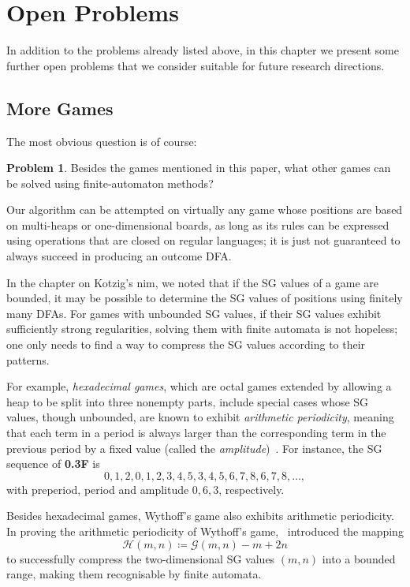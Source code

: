 \documentclass[11pt]{article}
\theoremstyle{definition}
\newtheorem{problem}{Problem}[section]
\theoremstyle{plain}
\newcommand{\varG}{\mathcal{G}}
\newcommand{\varH}{\mathcal{H}}
\begin{document}
\section{Open Problems}

In addition to the problems already listed above, in this chapter we present some further open problems that we consider suitable for future research directions.

\subsection{More Games}

The most obvious question is of course:
\begin{problem}
    Besides the games mentioned in this paper, what other games can be solved using finite-automaton methods?
\end{problem}
Our algorithm can be attempted on virtually any game whose positions are based on multi-heaps or one-dimensional boards, as long as its rules can be expressed using operations that are closed on regular languages; it is just not guaranteed to always succeed in producing an outcome DFA.

In the chapter on Kotzig's nim, we noted that if the SG values of a game are bounded, it may be possible to determine the SG values of positions using finitely many DFAs.
For games with unbounded SG values, if their SG values exhibit sufficiently strong regularities, solving them with finite automata is not hopeless; one only needs to find a way to compress the SG values according to their patterns.

For example, \textit{hexadecimal games}, which are octal games extended by allowing a heap to be split into three nonempty parts, include special cases whose SG values, though unbounded, are known to exhibit \textit{arithmetic periodicity},
meaning that each term in a period is always larger than the corresponding term in the previous period by a fixed value (called the \textit{amplitude})~\cite{2004Hexa}.
For instance, the SG sequence of \textbf{0.3F} is
\[
    0, 1, 2, 0, 1, 2, 3, 4, 5, 3, 4, 5, 6, 7, 8, 6, 7, 8, \ldots,
\]
with preperiod, period and amplitude $0, 6, 3$, respectively.

Besides hexadecimal games, Wythoff's game also exhibits arithmetic periodicity.
In proving the arithmetic periodicity of Wythoff's game,~\cite{2002Wyth} introduced the mapping
\[
    \varH(m, n) \coloneq \varG(m,n) - m + 2n
\]
to successfully compress the two-dimensional SG values $(m,n)$ into a bounded range, making them recognisable by finite automata.
\end{document}

